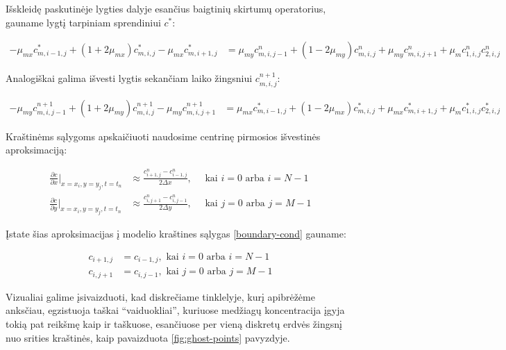 Išskleidę paskutinėje lygties dalyje esančius baigtinių skirtumų operatorius, gauname lygtį tarpiniam sprendiniui $c^*$:

\begin{align} \label{eqs:adi-short-half}
  -\mu_{mx}c^{*}_{m,i-1,j}+(1+2\mu_{mx})c^{*}_{m,i,j}-\mu_{mx}c^{*}_{m,i+1,j}
  &= \mu_{my}c^n_{m,i,j-1}+(1-2\mu_{my})c^n_{m,i,j}+\mu_{my}c^n_{m,i,j+1}+\mu_m c^n_{1,i,j}c^n_{2,i,j}
\end{align}

Analogiškai galima išvesti lygtis sekančiam laiko žingsniui $c^{n+1}_{m,i,j}$:

\begin{align} \label{eqs:adi-short-next}
  -\mu_{my}c^{n+1}_{m,i,j-1}+(1+2\mu_{my})c^{n+1}_{m,i,j}-\mu_{my}c^{n+1}_{m,i,j+1}
  &= \mu_{mx}c^*_{m,i-1,j}+(1-2\mu_{mx})c^*_{m,i,j}+\mu_{mx}c^*_{m,i+1,j}+\mu_m c^*_{1,i,j}c^*_{2,i,j}
\end{align}

Kraštinėms sąlygoms apskaičiuoti naudosime centrinę pirmosios išvestinės aproksimaciją:

\begin{align*}
  \frac{\partial c}{\partial x}\Big|_{x=x_i, y=y_j, t=t_n} 
  &\approx \frac{c^n_{i+1,j}-c^n_{i-1,j}}{2\Delta x},\quad
  \text{ kai } i = 0 \text{ arba } i = N - 1
  \\
  \frac{\partial c}{\partial y}\Big|_{x=x_i, y=y_j, t=t_n} 
  &\approx \frac{c^n_{i,j+1}-c^n_{i,j-1}}{2\Delta y},\quad
  \text{ kai } j = 0 \text{ arba } j = M - 1
\end{align*}

Įstate šias aproksimacijas į modelio kraštines sąlygas \eqref{boundary-cond} gauname:

\begin{subequations} \label{boundary-cond-approx}
\begin{align} 
  c_{i+1,j} &= c_{i-1,j}, \text{ kai } i = 0 \text{ arba } i = N-1 \\
  c_{i,j+1} &= c_{i,j-1}, \text{ kai } j = 0 \text{ arba } j = M-1
\end{align}
\end{subequations}

\newpage

Vizualiai galime įsivaizduoti, kad diskrečiame tinklelyje, kurį apibrėžėme anksčiau, egzistuoja taškai \enquote{vaiduokliai}, kuriuose medžiagų koncentracija įgyja tokią pat reikšmę kaip ir taškuose, esančiuose per vieną diskretų erdvės žingsnį nuo srities kraštinės, kaip pavaizduota \ref{fig:ghost-points} pavyzdyje.

